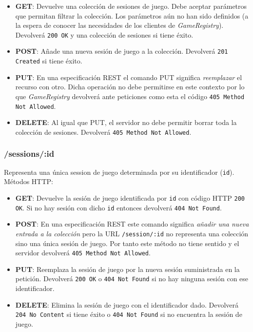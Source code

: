 \begin{itemize}
 \item \textbf{GET}: Devuelve una colección de sesiones de juego. Debe aceptar
       parámetros que permitan filtrar la colección. Los parámetros aún no han
       sido definidos (a la espera de conocer las necesidades de los clientes 
       de \emph{GameRegistry}). Devolverá \texttt{200 OK} y una colección de
       sesiones si tiene éxito.
 \item \textbf{POST}: Añade una nueva sesión de juego a la colección. Devolverá
       \texttt{201 Created} si tiene éxito.
 \item \textbf{PUT}: En una especificación REST el comando PUT significa 
       \emph{reemplazar} el recurso con otro. Dicha operación no debe permitirse
       en este contexto por lo que \emph{GameRegistry} devolverá ante peticiones
       como esta el código \texttt{405 Method Not Allowed}.
 \item \textbf{DELETE}: Al igual que PUT, el servidor no debe permitir borrar toda
       la colección de sesiones. Devolverá \texttt{405 Method Not Allowed}.
\end{itemize}

\subsubsection{/sessions/:id}
Representa una única session de juego determinada por su identificador (\texttt{id}). 
Métodos HTTP:

\begin{itemize}
 \item \textbf{GET}: Devuelve la sesión de juego identificada por \texttt{id} con
       código HTTP \texttt{200 OK}. Si no hay sesión con dicho \texttt{id} entonces
       devolverá \texttt{404 Not Found}.
 \item \textbf{POST}: En una especificación REST este comando significa 
       \emph{añadir una nueva entrada a la colección} pero la URL 
       \texttt{/session/:id} no representa una colección sino una única sesión de juego.
       Por tanto este método no tiene sentido y el servidor devolverá 
       \texttt{405 Method Not Allowed}.
 \item \textbf{PUT}: Reemplaza la sesión de juego por la nueva sesión suministrada
       en la petición. Devolverá \texttt{200 OK} o \texttt{404 Not Found} si no hay
       ninguna sesión con ese identificador.
 \item \textbf{DELETE}: Elimina la sesión de juego con el identificador dado. Devolverá
       \texttt{204 No Content} si tiene éxito o \texttt{404 Not Found} si no encuentra
       la sesión de juego.
\end{itemize}

